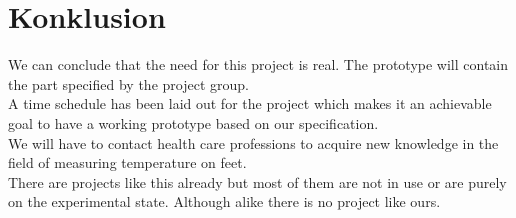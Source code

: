\chapter{Konklusion}
We can conclude that the need for this project is real. The prototype will contain the part specified by the project group.\\
A time schedule has been laid out for the project which makes it an achievable goal to have a working prototype based on our specification.\\
We will have to contact health care professions to acquire new knowledge in the field of measuring temperature on feet.\\
There are projects like this already but most of them are not in use or are purely on the experimental state. Although alike there is no project like ours.\\